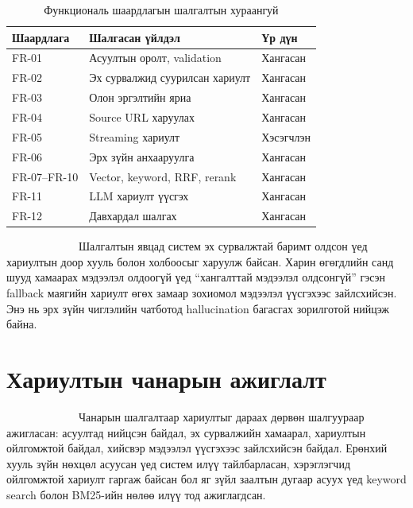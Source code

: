 \documentclass[12pt,A4]{report}
\begin{document}
\begin{table}[H]
\renewcommand{\tablename}{Хүснэгт}
\centering
\caption{Функциональ шаардлагын шалгалтын хураангуй}
\begin{tabular}{|l|l|l|}
\hline
\textbf{Шаардлага} & \textbf{Шалгасан үйлдэл} & \textbf{Үр дүн} \\
\hline
FR-01 & Асуултын оролт, validation & Хангасан \\
FR-02 & Эх сурвалжид суурилсан хариулт & Хангасан \\
FR-03 & Олон эргэлтийн яриа & Хангасан \\
FR-04 & Source URL харуулах & Хангасан \\
FR-05 & Streaming хариулт & Хэсэгчлэн \\
FR-06 & Эрх зүйн анхааруулга & Хангасан \\
FR-07--FR-10 & Vector, keyword, RRF, rerank & Хангасан \\
FR-11 & LLM хариулт үүсгэх & Хангасан \\
FR-12 & Давхардал шалгах & Хангасан \\
\hline
\end{tabular}
\label{tab:functional_result}
\end{table}

\ \ \ \ \ \ \ \ \  \ \ \ \ Шалгалтын явцад систем эх сурвалжтай
баримт олдсон үед хариултын доор хууль болон холбоосыг харуулж байсан.
Харин өгөгдлийн санд шууд хамаарах мэдээлэл олдоогүй үед ``хангалттай
мэдээлэл олдсонгүй'' гэсэн fallback маягийн хариулт өгөх замаар
зохиомол мэдээлэл үүсгэхээс зайлсхийсэн. Энэ нь эрх зүйн чиглэлийн
чатботод hallucination багасгах зорилготой нийцэж байна.

\section{Хариултын чанарын ажиглалт}

\ \ \ \ \ \ \ \ \  \ \ \ \ Чанарын шалгалтаар хариултыг дараах
дөрвөн шалгуураар ажигласан: асуултад нийцсэн байдал, эх сурвалжийн
хамаарал, хариултын ойлгомжтой байдал, хийсвэр мэдээлэл үүсгэхээс
зайлсхийсэн байдал. Ерөнхий хууль зүйн нөхцөл асуусан үед систем
илүү тайлбарласан, хэрэглэгчид ойлгомжтой хариулт гаргаж байсан бол
яг зүйл заалтын дугаар асуух үед keyword search болон BM25-ийн нөлөө
илүү тод ажиглагдсан.
\end{document}
